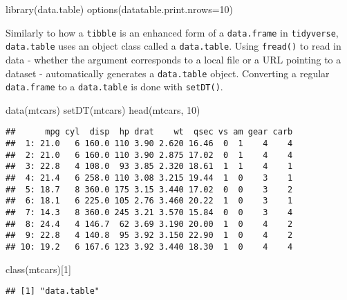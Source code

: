 \documentclass[
]{book}
\newenvironment{Shaded}{\begin{snugshade}}{\end{snugshade}}
\newcommand{\AttributeTok}[1]{\textcolor[rgb]{0.77,0.63,0.00}{#1}}
\newcommand{\DecValTok}[1]{\textcolor[rgb]{0.00,0.00,0.81}{#1}}
\newcommand{\FunctionTok}[1]{\textcolor[rgb]{0.00,0.00,0.00}{#1}}
\newcommand{\NormalTok}[1]{#1}
\begin{document}
\begin{Shaded}
\begin{Highlighting}[]
\FunctionTok{library}\NormalTok{(data.table)}
\FunctionTok{options}\NormalTok{(}\AttributeTok{datatable.print.nrows=}\DecValTok{10}\NormalTok{)}
\end{Highlighting}
\end{Shaded}

Similarly to how a \texttt{tibble} is an enhanced form of a \texttt{data.frame} in \texttt{tidyverse}, \texttt{data.table} uses an object class called a \texttt{data.table}. Using \texttt{fread()} to read in data - whether the argument corresponds to a local file or a URL pointing to a dataset - automatically generates a \texttt{data.table} object. Converting a regular \texttt{data.frame} to a \texttt{data.table} is done with \texttt{setDT()}.

\begin{Shaded}
\begin{Highlighting}[]
\FunctionTok{data}\NormalTok{(mtcars)}
\FunctionTok{setDT}\NormalTok{(mtcars)}
\FunctionTok{head}\NormalTok{(mtcars, }\DecValTok{10}\NormalTok{)}
\end{Highlighting}
\end{Shaded}

\begin{verbatim}
##      mpg cyl  disp  hp drat    wt  qsec vs am gear carb
##  1: 21.0   6 160.0 110 3.90 2.620 16.46  0  1    4    4
##  2: 21.0   6 160.0 110 3.90 2.875 17.02  0  1    4    4
##  3: 22.8   4 108.0  93 3.85 2.320 18.61  1  1    4    1
##  4: 21.4   6 258.0 110 3.08 3.215 19.44  1  0    3    1
##  5: 18.7   8 360.0 175 3.15 3.440 17.02  0  0    3    2
##  6: 18.1   6 225.0 105 2.76 3.460 20.22  1  0    3    1
##  7: 14.3   8 360.0 245 3.21 3.570 15.84  0  0    3    4
##  8: 24.4   4 146.7  62 3.69 3.190 20.00  1  0    4    2
##  9: 22.8   4 140.8  95 3.92 3.150 22.90  1  0    4    2
## 10: 19.2   6 167.6 123 3.92 3.440 18.30  1  0    4    4
\end{verbatim}

\begin{Shaded}
\begin{Highlighting}[]
\FunctionTok{class}\NormalTok{(mtcars)[}\DecValTok{1}\NormalTok{]}
\end{Highlighting}
\end{Shaded}

\begin{verbatim}
## [1] "data.table"
\end{verbatim}
\end{document}

